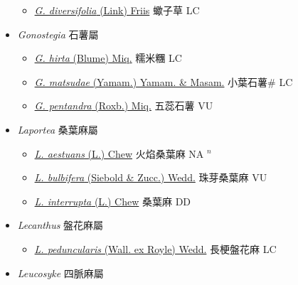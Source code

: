 \begin{itemize}
  \begin{itemize}
        \item[] \href{http://www.theplantlist.org/tpl1.1/search?q=Girardinia+diversifolia}{\textit{G. diversifolia} (Link) Friis}   蠍子草 LC
  \end{itemize}
 \item[] \textit{Gonostegia} 石薯屬
                    
  \begin{itemize}
        \item[] \href{http://www.theplantlist.org/tpl1.1/search?q=Gonostegia+hirta}{\textit{G. hirta} (Blume) Miq.}   糯米糰 LC
        \item[] \href{http://www.theplantlist.org/tpl1.1/search?q=Gonostegia+matsudae}{\textit{G. matsudae} (Yamam.) Yamam. \& Masam.}   小葉石薯\# LC
        \item[] \href{http://www.theplantlist.org/tpl1.1/search?q=Gonostegia+pentandra}{\textit{G. pentandra} (Roxb.) Miq.}   五蕊石薯 VU
  \end{itemize}
 \item[] \textit{Laportea} 桑葉麻屬
                    
  \begin{itemize}
        \item[] \href{http://www.theplantlist.org/tpl1.1/search?q=Laportea+aestuans}{\textit{L. aestuans} (L.) Chew}   火焰桑葉麻 NA $^n$
        \item[] \href{http://www.theplantlist.org/tpl1.1/search?q=Laportea+bulbifera}{\textit{L. bulbifera} (Siebold \& Zucc.) Wedd.}   珠芽桑葉麻 VU
        \item[] \href{http://www.theplantlist.org/tpl1.1/search?q=Laportea+interrupta}{\textit{L. interrupta} (L.) Chew}   桑葉麻 DD
  \end{itemize}
 \item[] \textit{Lecanthus} 盤花麻屬
                    
  \begin{itemize}
        \item[] \href{http://www.theplantlist.org/tpl1.1/search?q=Lecanthus+peduncularis}{\textit{L. peduncularis} (Wall. ex Royle) Wedd.}   長梗盤花麻 LC
  \end{itemize}
 \item[] \textit{Leucosyke} 四脈麻屬
                    

\end{itemize}
